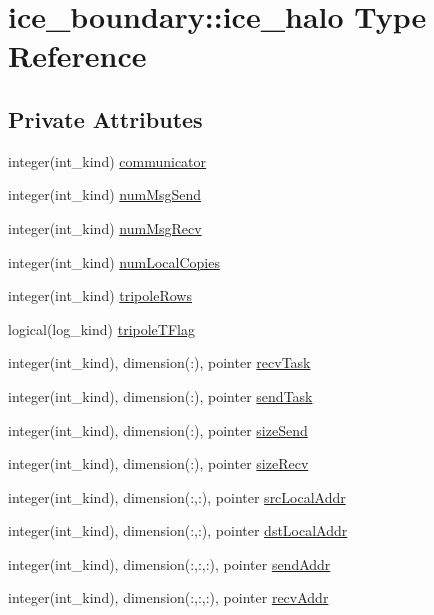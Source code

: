 \hypertarget{typeice__boundary_1_1ice__halo}{
\section{ice\_\-boundary::ice\_\-halo Type Reference}
\label{typeice__boundary_1_1ice__halo}
}
\subsection*{Private Attributes}
\begin{DoxyCompactItemize}
\item 
integer(int\_\-kind) \hyperlink{typeice__boundary_1_1ice__halo_a2c3bc7e1a28bb3eda818533eb6bb0ffa}{communicator}
\item 
integer(int\_\-kind) \hyperlink{typeice__boundary_1_1ice__halo_a361ae70131f21b9bf2a73846897687c7}{numMsgSend}
\item 
integer(int\_\-kind) \hyperlink{typeice__boundary_1_1ice__halo_aba8e9b8f14be29157688614ca6fd5fe4}{numMsgRecv}
\item 
integer(int\_\-kind) \hyperlink{typeice__boundary_1_1ice__halo_a66c29ae275de42ddc392d9b612db889b}{numLocalCopies}
\item 
integer(int\_\-kind) \hyperlink{typeice__boundary_1_1ice__halo_aa99a48d3d59fc70b1260a1f267b752f2}{tripoleRows}
\item 
logical(log\_\-kind) \hyperlink{typeice__boundary_1_1ice__halo_adc7cf6a34ad3e931ddbded6ef57b5d1d}{tripoleTFlag}
\item 
integer(int\_\-kind), dimension(:), pointer \hyperlink{typeice__boundary_1_1ice__halo_aaad7d6023e014b677e11253c0ee55f77}{recvTask}
\item 
integer(int\_\-kind), dimension(:), pointer \hyperlink{typeice__boundary_1_1ice__halo_a77af58ceddef96f27a1d39b92e459db1}{sendTask}
\item 
integer(int\_\-kind), dimension(:), pointer \hyperlink{typeice__boundary_1_1ice__halo_afcdc902a1c162578d137996a3f172684}{sizeSend}
\item 
integer(int\_\-kind), dimension(:), pointer \hyperlink{typeice__boundary_1_1ice__halo_ac70cbe1ad58dfe39d1b7083d9dcaf5b1}{sizeRecv}
\item 
integer(int\_\-kind), dimension(:,:), pointer \hyperlink{typeice__boundary_1_1ice__halo_a396d5672cdeedfc9fb66749bce9654b9}{srcLocalAddr}
\item 
integer(int\_\-kind), dimension(:,:), pointer \hyperlink{typeice__boundary_1_1ice__halo_ae2c9a8697a47b692ca8c945b4dd2d251}{dstLocalAddr}
\item 
integer(int\_\-kind), dimension(:,:,:), pointer \hyperlink{typeice__boundary_1_1ice__halo_a9c316677935c87c4c7a738c7a4a5e69c}{sendAddr}
\item 
integer(int\_\-kind), dimension(:,:,:), pointer \hyperlink{typeice__boundary_1_1ice__halo_a68312a01cf31b733be7e0fb3ef9ab42c}{recvAddr}
\end{DoxyCompactItemize}


